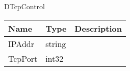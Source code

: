  {DTcpControl}
\begin{tabular}[ht]{|l|l|p{8cm}|}
\hline
\textbf{Name} & \textbf{Type} & \textbf{Description}\\
\hline
IPAddr & string & \\
\hline
TcpPort & int32 & \\
\hline
\end{tabular}


